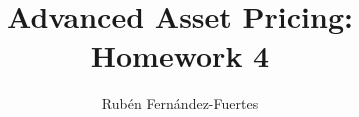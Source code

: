 \documentclass{article}
\begin{document}
%	
\author{Rubén Fernández-Fuertes}
\title{Advanced Asset Pricing: Homework 4}
\maketitle
	
	
\end{document}
